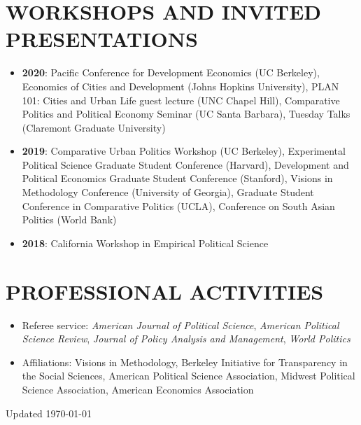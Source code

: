 \documentclass[10pt]{article}
\begin{document}
\vspace{3mm}
\section*{WORKSHOPS AND INVITED PRESENTATIONS}

\begin{itemize}[nosep]
\item[] \textbf{2020}: Pacific Conference for Development Economics (UC Berkeley), Economics of Cities and Development (Johns Hopkins University), PLAN 101: Cities and Urban Life guest lecture (UNC Chapel Hill), Comparative Politics and Political Economy Seminar (UC Santa Barbara), Tuesday Talks (Claremont Graduate University)
\item[] \textbf{2019}: Comparative Urban Politics Workshop (UC Berkeley), Experimental Political Science Graduate Student Conference (Harvard), Development and Political Economics Graduate Student Conference (Stanford), Visions in Methodology Conference (University of Georgia), Graduate Student Conference in Comparative Politics (UCLA), Conference on South Asian Politics (World Bank)
\item[] \textbf{2018}: California Workshop in Empirical Political Science
\end{itemize}

\vspace{3mm}
\section*{PROFESSIONAL ACTIVITIES}


\begin{itemize}	

\item[]Referee service: \textit{American Journal of Political Science}, \textit{American Political Science Review}, \textit{Journal of Policy Analysis and Management}, \textit{World Politics}
\item[]Affiliations: Visions in Methodology, Berkeley Initiative for Transparency in the Social Sciences, American Political Science Association, Midwest Political Science Association, American Economics Association
\end{itemize}









\vspace*{\fill}

Updated \today
\end{document}
